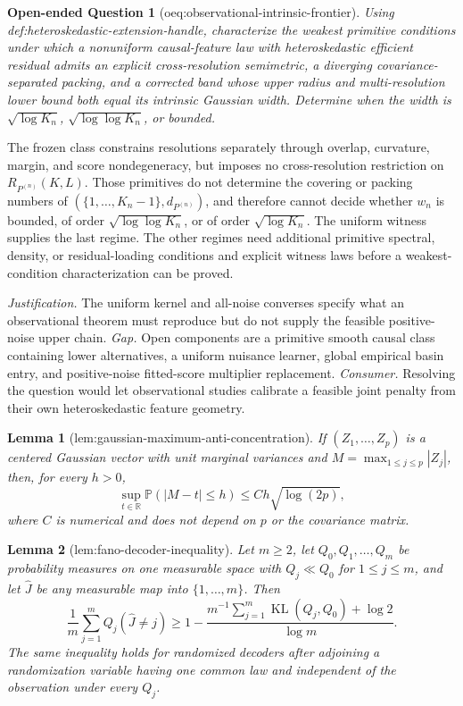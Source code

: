 \documentclass{article}
\newtheorem{lemma}{Lemma}
\newtheorem{openendedquestion}{Open-ended Question}
\begin{document}
\begin{openendedquestion}[oeq:observational-intrinsic-frontier]\label{oeq:observational-intrinsic-frontier}
Using def:heteroskedastic-extension-handle, characterize the weakest primitive conditions under which a nonuniform causal-feature law with heteroskedastic efficient residual admits an explicit cross-resolution semimetric, a diverging covariance-separated packing, and a corrected band whose upper radius and multi-resolution lower bound both equal its intrinsic Gaussian width. Determine when the width is \(\sqrt{\log K_n}\), \(\sqrt{\log\log K_n}\), or bounded.
\end{openendedquestion}
The frozen class constrains resolutions separately through overlap, curvature, margin, and score nondegeneracy, but imposes no cross-resolution restriction on \(R_{P^{(n)}}(K,L)\).  Those primitives do not determine the covering or packing numbers of \((\{1,\ldots,K_n-1\},d_{P^{(n)}})\), and therefore cannot decide whether \(w_n\) is bounded, of order \(\sqrt{\log\log K_n}\), or of order \(\sqrt{\log K_n}\).  The uniform witness supplies the last regime.  The other regimes need additional primitive spectral, density, or residual-loading conditions and explicit witness laws before a weakest-condition characterization can be proved.
\par\smallskip\noindent \textit{Justification.} The uniform kernel and all-noise converses specify what an observational theorem must reproduce but do not supply the feasible positive-noise upper chain. \textit{Gap.} Open components are a primitive smooth causal class containing lower alternatives, a uniform nuisance learner, global empirical basin entry, and positive-noise fitted-score multiplier replacement. \textit{Consumer.} Resolving the question would let observational studies calibrate a feasible joint penalty from their own heteroskedastic feature geometry.

\begin{lemma}[lem:gaussian-maximum-anti-concentration]\label{lem:gaussian-maximum-anti-concentration}
If \((Z_1,\ldots,Z_p)\) is a centered Gaussian vector with unit marginal variances and \(M=\max_{1\leq j\leq p}|Z_j|\), then, for every \(h>0\),
\[
 \sup_{t\in\mathbb R}\mathbb P(|M-t|\leq h)
 \leq Ch\sqrt{\log(2p)},
\]
where \(C\) is numerical and does not depend on \(p\) or the covariance matrix.
\end{lemma}

\begin{lemma}[lem:fano-decoder-inequality]\label{lem:fano-decoder-inequality}
Let \(m\geq2\), let \(Q_0,Q_1,\ldots,Q_m\) be probability measures on one measurable space with \(Q_j\ll Q_0\) for \(1\leq j\leq m\), and let \(\widehat J\) be any measurable map into \(\{1,\ldots,m\}\).  Then
\[
 \frac1m\sum_{j=1}^m Q_j(\widehat J\neq j)
 \geq 1-\frac{m^{-1}\sum_{j=1}^m\operatorname{KL}(Q_j,Q_0)+\log2}{\log m}.
\]
The same inequality holds for randomized decoders after adjoining a randomization variable having one common law and independent of the observation under every \(Q_j\).
\end{lemma}
\end{document}
